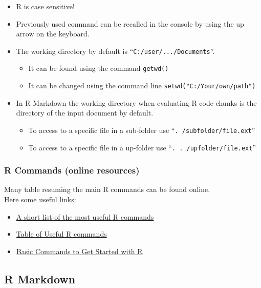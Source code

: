 \documentclass[
]{article}
\providecommand{\tightlist}{%
  \setlength{\itemsep}{0pt}\setlength{\parskip}{0pt}}
\begin{document}
\begin{itemize}
\tightlist
\item
  R is case sensitive!
\item
  Previously used command can be recalled in the console by using the up arrow on the keyboard.
\item
  The working directory by default is ``\texttt{C:/user/.../Documents}''.

  \begin{itemize}
  \tightlist
  \item
    It can be found using the command \texttt{getwd()}
  \item
    It can be changed using the command line \texttt{setwd("C:/Your/own/path")}
  \end{itemize}
\item
  In R Markdown the working directory when evaluating R code chunks is the directory of the input document by default.

  \begin{itemize}
  \tightlist
  \item
    To access to a specific file in a sub-folder use ``\texttt{.\ /subfolder/file.ext}''
  \item
    To access to a specific file in a up-folder use ``\texttt{.\ .\ /upfolder/file.ext}''
  \end{itemize}
\end{itemize}

\subsubsection{R Commands (online resources)}\label{r-commands-online-resources}

Many table resuming the main R commands can be found online.\\
Here some useful links:

\begin{itemize}
\tightlist
\item
  \href{https://www.maths.usyd.edu.au/u/jchan/Rcommands.pdf}{A short list of the most useful R commands}
\item
  \href{https://sites.calvin.edu/scofield/courses/m143/materials/RcmdsFromClass.pdf}{Table of Useful R commands}
\item
  \href{https://rpubs.com/ssammut/ResearchStats}{Basic Commands to Get Started with R}
\end{itemize}

\subsection{R Markdown}\label{r-markdown}
\end{document}
